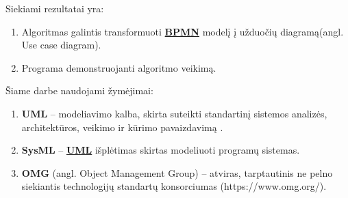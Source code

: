 \documentclass{VUMIFInfBakalaurinis}
\newcommand{\bhyperref}[2]{\hyperref[#1]{\textbf{#2}}}
\newcommand{\BPMN}{\bhyperref{section:bpmn}{BPMN}}
\newcommand{\UML}{\bhyperref{def:uml}{UML}}
\begin{document}
Siekiami rezultatai yra:
\begin{enumerate}
	\item Algoritmas galintis transformuoti \BPMN{} modelį į užduočių diagramą(angl. Use case diagram).
	\item Programa demonstruojanti algoritmo veikimą.
\end{enumerate}







\printbibliography[heading=bibintoc] %

Šiame darbe naudojami žymėjimai:
\begin{enumerate}
	\item \textbf{UML} – modeliavimo kalba, skirta suteikti standartinį sistemos analizės, architektūros, veikimo ir kūrimo pavaizdavimą \cite{omgUmlFormal}. \label{def:uml}
	\item \textbf{SysML} – \UML{} išplėtimas skirtas modeliuoti programų sistemas. \cite{OMGSysML} \label{def:sysml}
	\item \textbf{OMG} (angl. Object Management Group) – atviras, tarptautinis ne pelno siekiantis technologijų standartų konsorciumas (https://www.omg.org/). \label{def:omg}
\end{enumerate}
\end{document}
